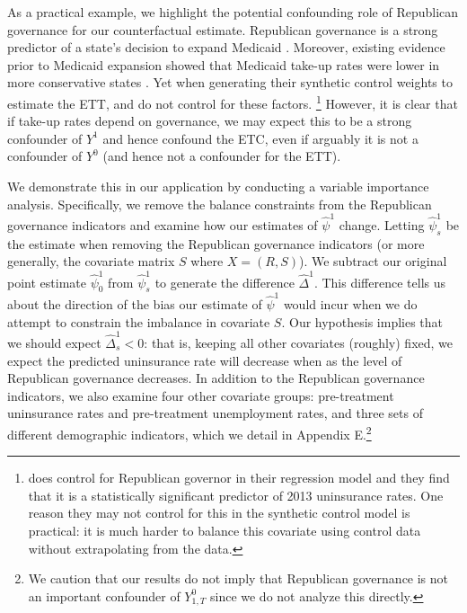As a practical example, we highlight the potential confounding role of Republican governance for our counterfactual estimate. Republican governance is a strong predictor of a state's decision to expand Medicaid \cite{courtemanche2017early}. Moreover, existing evidence prior to Medicaid expansion showed that Medicaid take-up rates were lower in more conservative states \cite{sommers2012understanding}. Yet when generating their synthetic control weights to estimate the ETT, \cite{courtemanche2017early} and \cite{kaestner2017effects} do not control for these factors. \footnote{\cite{courtemanche2017early} does control for Republican governor in their regression model and they find that it is a statistically significant predictor of 2013 uninsurance rates. One reason they may not control for this in the synthetic control model is practical: it is much harder to balance this covariate using control data without extrapolating from the data.} However, it is clear that if take-up rates depend on governance, we may expect this to be a strong confounder of $Y^1$ and hence confound the ETC, even if arguably it is not a confounder of $Y^0$ (and hence not a confounder for the ETT).

We demonstrate this in our application by conducting a variable importance analysis. Specifically, we remove the balance constraints from the Republican governance indicators and examine how our estimates of $\hat{\psi}^1$ change. Letting $\hat{\psi}^1_s$ be the estimate when removing the Republican governance indicators (or more generally, the covariate matrix $S$ where $X = (R, S)$). We subtract our original point estimate $\hat{\psi}^1_0$ from $\hat{\psi}^1_s$ to generate the difference $\hat{\Delta}^1$. This difference tells us about the direction of the bias our estimate of $\hat{\psi}^1$ would incur when we do attempt to constrain the imbalance in covariate $S$. Our hypothesis implies that we should expect $\hat{\Delta}_s^1 < 0$: that is, keeping all other covariates (roughly) fixed, we expect the predicted uninsurance rate will decrease when as the level of Republican governance decreases. In addition to the Republican governance indicators, we also examine four other covariate groups: pre-treatment uninsurance rates and pre-treatment unemployment rates, and three sets of different demographic indicators, which we detail in Appendix E.\footnote{We caution that our results do not imply that Republican governance is not an important confounder of $Y^0_{1, T}$ since we do not analyze this directly.} 

